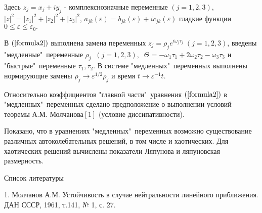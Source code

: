 \documentclass[12pt, a4paper]{extarticle}
\begin{document}
Здесь $z_j = x_j + iy_j$ - комплекснозначные переменные $ (j = 1,2,3)$, $|z|^2 = |z_1|^2 +|z_2|^2 +|z_3|^2$, $a_{jk}(\varepsilon) = b_{jk}(\varepsilon) + i c_{jk}(\varepsilon)$ гладкие функции $0 \leq \varepsilon \leq \varepsilon_0.$  

В $(\ref{formula2})$ выполнена замена переменных $z_j = \rho_j e^{i\omega_j\tau_j} \; (j = 1,2,3)$, введены "медленные"\ переменные $\rho_j \;\; (j = 1,2,3), \;\; \Theta = -\omega_1\tau_1 + 2\omega_2\tau_2 - \omega_3\tau_3 $ и  "быстрые"\ переменные  $\tau_1, \tau_2 $. 
В системе "медленных"\ переменных выполнены нормирующие замены $\rho_j\rightarrow \varepsilon^{1/2}\rho_j$ и время $t \rightarrow \varepsilon^{-1} t$. 

Относительно коэффициентов "главной части"\ уравнения $(\ref{formula2})$ в "медленных"\ переменных  сделано предположение о выполнении условий теоремы А.М. Молчанова$[1]$ (условие диссипативности).

Показано, что в уравнениях "медленных"\ переменных возможно существование различных автоколебательных решений, в том числе и хаотических. Для хаотических решений вычислены показатели Ляпунова и ляпуновская размерность.

\medskip

{\large \noindent Список литературы}

1. Молчанов А.М. Устойчивость в случае нейтральности линейного приближения. ДАН СССР, 1961, т.141, № 1, с. 27.
\end{document}
